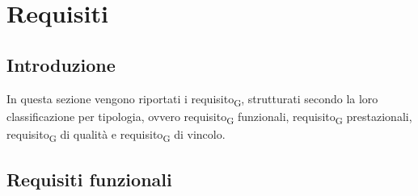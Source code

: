 \section{Requisiti}
\subsection{Introduzione}
In questa sezione vengono riportati i requisito\textsubscript{G}, strutturati secondo la loro classificazione per tipologia, ovvero requisito\textsubscript{G} funzionali, requisito\textsubscript{G} prestazionali, requisito\textsubscript{G} di qualità e requisito\textsubscript{G} di vincolo.
\subsection{Requisiti funzionali}
\renewcommand{\arraystretch}{1.5}
